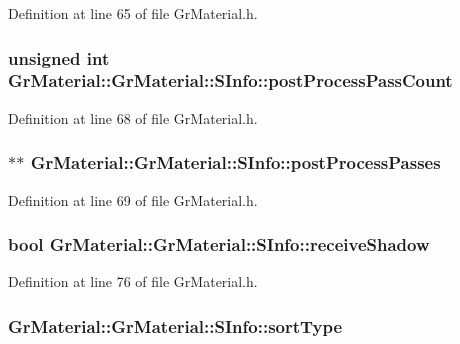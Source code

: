 Definition at line 65 of file GrMaterial.h.\hypertarget{struct_gr_material_1_1_s_info_1ce2cf4342c4ca673c726468213833d4}{
\subsubsection[{postProcessPassCount}]{\setlength{\rightskip}{0pt plus 5cm}unsigned int GrMaterial::GrMaterial::SInfo::postProcessPassCount}}
\label{struct_gr_material_1_1_s_info_1ce2cf4342c4ca673c726468213833d4}




Definition at line 68 of file GrMaterial.h.\hypertarget{struct_gr_material_1_1_s_info_d0f2426e55d78a596ef62dd78624a180}{
\subsubsection[{postProcessPasses}]{$\ast$$\ast$ GrMaterial::GrMaterial::SInfo::postProcessPasses}}
\label{struct_gr_material_1_1_s_info_d0f2426e55d78a596ef62dd78624a180}




Definition at line 69 of file GrMaterial.h.\hypertarget{struct_gr_material_1_1_s_info_83ca23e73b506b9bdab98b43ab1bdf6f}{
\subsubsection[{receiveShadow}]{\setlength{\rightskip}{0pt plus 5cm}bool GrMaterial::GrMaterial::SInfo::receiveShadow}}
\label{struct_gr_material_1_1_s_info_83ca23e73b506b9bdab98b43ab1bdf6f}




Definition at line 76 of file GrMaterial.h.\hypertarget{struct_gr_material_1_1_s_info_26bcefa25e0ad2e18440c4c660fbc6bf}{
\subsubsection[{sortType}]{ GrMaterial::GrMaterial::SInfo::sortType}}
\label{struct_gr_material_1_1_s_info_26bcefa25e0ad2e18440c4c660fbc6bf}




